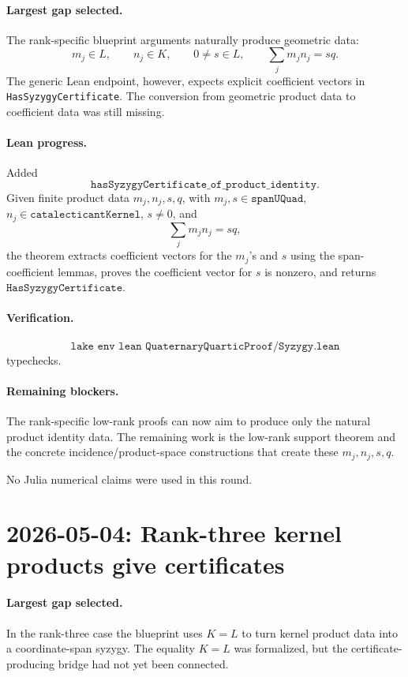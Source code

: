 \documentclass[11pt]{article}
\begin{document}
\paragraph{Largest gap selected.}
The rank-specific blueprint arguments naturally produce geometric data:
\[
m_j\in L,\qquad n_j\in K,\qquad 0\ne s\in L,\qquad
\sum_j m_jn_j=sq.
\]
The generic Lean endpoint, however, expects explicit coefficient vectors in
\texttt{HasSyzygyCertificate}.  The conversion from geometric product data to
coefficient data was still missing.

\paragraph{Lean progress.}
Added
\[
\texttt{hasSyzygyCertificate\_of\_product\_identity}.
\]
Given finite product data \(m_j,n_j,s,q\), with \(m_j,s\in\texttt{spanUQuad}\),
\(n_j\in\texttt{catalecticantKernel}\), \(s\ne0\), and
\[
\sum_j m_jn_j=sq,
\]
the theorem extracts coefficient vectors for the \(m_j\)'s and \(s\) using the
span-coefficient lemmas, proves the coefficient vector for \(s\) is nonzero,
and returns \(\texttt{HasSyzygyCertificate}\).

\paragraph{Verification.}
\[
\texttt{lake env lean QuaternaryQuarticProof/Syzygy.lean}
\]
typechecks.

\paragraph{Remaining blockers.}
The rank-specific low-rank proofs can now aim to produce only the natural
product identity data.  The remaining work is the low-rank support theorem and
the concrete incidence/product-space constructions that create these
\(m_j,n_j,s,q\).

No Julia numerical claims were used in this round.

\section*{2026-05-04: Rank-three kernel products give certificates}

\paragraph{Largest gap selected.}
In the rank-three case the blueprint uses \(K=L\) to turn kernel product data
into a coordinate-span syzygy.  The equality \(K=L\) was formalized, but the
certificate-producing bridge had not yet been connected.
\end{document}
